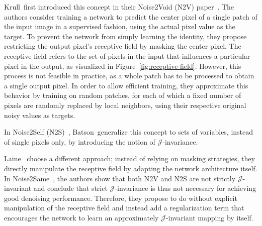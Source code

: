 Krull~\etal first introduced this concept in their Noise2Void (N2V) paper~\cite{N2V}.
The authors consider training a network to predict the center pixel of a single patch of the input image in a supervised fashion, using the actual pixel value as the target.
To prevent the network from simply learning the identity, they propose restricting the output pixel's receptive field by masking the center pixel.
The receptive field refers to the set of pixels in the input that influences a particular pixel in the output, as visualized in Figure~\ref{fig:receptive-field}.
However, this process is not feasible in practice, as a whole patch has to be processed to obtain a single output pixel.
In order to allow efficient training, they approximate this behavior by training on random patches, for each of which a fixed number of pixels are randomly replaced by local neighbors, using their respective original noisy values as targets.

In Noise2Self (N2S)~\cite{N2S}, Batson~\etal generalize this concept to sets of variables, instead of single pixels only, by introducing the notion of $\mathcal{J}$-invariance.

Laine~\etalc \cite{BSN} choose a different approach; instead of relying on masking strategies, they directly manipulate the receptive field by adapting the network architecture itself.
In Noise2Same~\cite{Noise2Same}, the authors show that both N2V and N2S are not strictly $\mathcal{J}$-invariant and  conclude that strict $\mathcal{J}$-invariance is thus not necessary for achieving good denoising performance.
Therefore, they propose to do without explicit manipulation of the receptive field and instead add a regularization term that encourages the network to learn an approximately $\mathcal{J}$-invariant mapping by itself.

